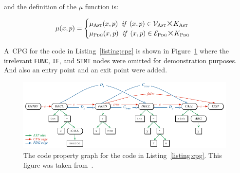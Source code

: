and the definition of the $\mu$ function is:
  
  \begin{equation*}
      \mu(x, p) = 
      \begin{cases} 
      \mu_{\textsc{Ast}} (x, p) \;\; \textit{if} \;\; (x, p) \in \mathcal{V}_{\textsc{Ast}} \bigtimes K_{\textsc{Ast}} \\
      \mu_{\textsc{Pdg}} (x, p) \;\; \textit{if} \;\; (x, p) \in \mathcal{E}_{\textsc{Pdg}} \bigtimes K_{\textsc{Pdg}} \\
   \end{cases}
  \end{equation*}

A~CPG for the code in Listing~\ref{listing:cpg} is shown in Figure~\ref{figure:CPG} where the irrelevant \texttt{FUNC}, \texttt{IF}, and \texttt{STMT} nodes were omitted for demonstration purposes. And also an entry point and an exit point were added.

\begin{figure}[t]
	\centering
	\includegraphics[width=0.98\textwidth]{figures/CPG.pdf}
	\caption{The code property graph for the code in Listing~\ref{listing:cpg}. This figure was taken from~\cite{CPG-yamaguchi2014modeling}.}
	\label{figure:CPG}
\end{figure}

